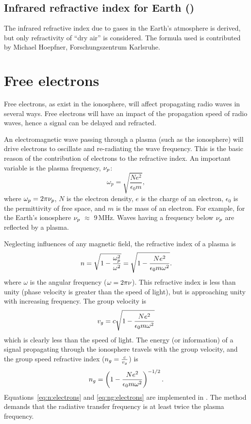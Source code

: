 \subsection{Infrared refractive index for Earth ()}
 \label{sec:rindex:IR}
The infrared refractive index due to gases in the Earth's atmosphere is derived,
but only refractivity of ``dry air'' is considered. The formula used is
contributed by Michael Hoepfner, Forschungszentrum Karlsruhe.


\section{Free electrons}
 \label{sec:rindex:freee}
%
Free electrons, as exist in the ionosphere, will affect propagating radio waves
in several ways. Free electrons will have an impact of the propagation speed of
radio waves, hence a signal can be delayed and refracted. 

An electromagnetic wave passing through a plasma (such as the ionosphere) will
drive electrons to oscillate and re-radiating the wave frequency. This is the
basic reason of the contribution of electrons to the refractive index. 
An important variable is the plasma frequency, $\nu_{p}$:
\begin{equation}
  \omega_{p}=\sqrt{\frac{Ne^{2}}{\epsilon_{0}m}},
\end{equation}
where \(\omega_{p}=2\pi\nu_{p}\), \(N\) is the electron density, \(e\) is the
charge of an electron, \(\epsilon_{0}\) is the permittivity of free space, and
\(m\) is the mass of an electron. For example, for the Earth's ionosphere
\(\nu_{p}\) \(\approx\) 9\,MHz.
Waves having a frequency below $\nu_{p}$ are reflected by a plasma.

Neglecting influences of any magnetic field, the refractive index of a plasma
is \citep[e.g.][]{rybicki:radia:79}
\begin{equation}
\label{eq:n:electrons}
n =\sqrt{1-\frac{\omega_{p}^{2}}{\omega^{2}}}=\sqrt{1-\frac{Ne^{2}}
{\epsilon_{0}m\omega^{2}}}.
\end{equation}
where $\omega$ is the angular frequency ($\omega=2\pi\nu$). This refractive
index is less than unity (phase velocity is greater than the speed of light),
but is approaching unity with increasing frequency. The group velocity is
\citep{rybicki:radia:79}
\begin{equation}
v_{g}=c\sqrt{1-\frac{Ne^{2}}
{\epsilon_{0}m\omega^{2}}}
\end{equation}
which is clearly less than the speed of light.
The energy (or information) of a signal propagating through the ionosphere
travels with the group velocity, and the group speed refractive
index (\(n_{g}=\frac{c}{v_{g}}\)) is
\begin{equation}
\label{eq:ng:electrons}
  n_{g}=\left(
    1-\frac{Ne^{2}}
    {\epsilon_{0}m\omega^{2}}
  \right)^{-1/2}.
\end{equation}
Equations~\ref{eq:n:electrons} and \ref{eq:ng:electrons} are implemented in
. The method demands that the radiative
transfer frequency is at least twice the plasma frequency.


